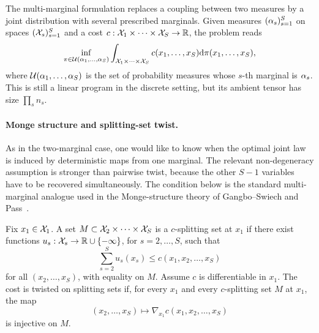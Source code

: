 The multi-marginal formulation replaces a coupling between two measures by a joint distribution with several prescribed marginals. Given measures $(\alpha_s)_{s=1}^S$ on spaces $(\mathcal{X}_s)_{s=1}^S$ and a cost $c:\mathcal{X}_1\times\cdots\times\mathcal{X}_S\to\mathbb{R}$, the problem reads
\[
	\inf_{\pi\in\mathcal{U}(\alpha_1,\ldots,\alpha_S)}
	\int_{\mathcal{X}_1\times\cdots\times\mathcal{X}_S}
	c(x_1,\ldots,x_S)\mathrm{d}\pi(x_1,\ldots,x_S),
\]
where $\mathcal{U}(\alpha_1,\ldots,\alpha_S)$ is the set of probability measures whose $s$-th marginal is $\alpha_s$. This is still a linear program in the discrete setting, but its ambient tensor has size $\prod_s n_s$.

\paragraph{Monge structure and splitting-set twist.}

As in the two-marginal case, one would like to know when the optimal joint law is induced by deterministic maps from one marginal. The relevant non-degeneracy assumption is stronger than pairwise twist, because the other $S-1$ variables have to be recovered simultaneously. The condition below is the standard multi-marginal analogue used in the Monge-structure theory of Gangbo--Swiech and Pass~\cite{GangboSciech,Pass2,PassMultiMarginalStructure,PassMultiReview}.

\begin{defn}\label{def-twist-splitting-sets}
	Fix $x_1\in\mathcal{X}_1$. A set $M\subset\mathcal{X}_2\times\cdots\times\mathcal{X}_S$ is a $c$-splitting set at $x_1$ if there exist functions $u_s:\mathcal{X}_s\to\mathbb{R}\cup\{-\infty\}$, for $s=2,\ldots,S$, such that
	\[
		\sum_{s=2}^S u_s(x_s)\leq c(x_1,x_2,\ldots,x_S)
	\]
	for all $(x_2,\ldots,x_S)$, with equality on $M$. Assume $c$ is differentiable in $x_1$. The cost is twisted on splitting sets if, for every $x_1$ and every $c$-splitting set $M$ at $x_1$, the map
	\[
		(x_2,\ldots,x_S)
		\longmapsto
		\nabla_{x_1}c(x_1,x_2,\ldots,x_S)
	\]
	is injective on $M$.
\end{defn}

